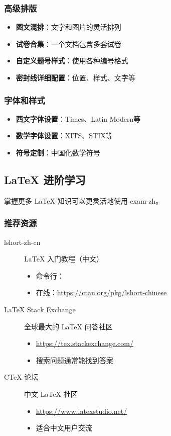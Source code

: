 \subsubsection{高级排版}

\begin{itemize}
  \item \textbf{图文混排}：文字和图片的灵活排列
  \item \textbf{试卷合集}：一个文档包含多套试卷
  \item \textbf{自定义题号样式}：使用各种编号格式
  \item \textbf{密封线详细配置}：位置、样式、文字等
\end{itemize}

\subsubsection{字体和样式}

\begin{itemize}
  \item \textbf{西文字体设置}：Times、Latin Modern等
  \item \textbf{数学字体设置}：XITS、STIX等
  \item \textbf{符号定制}：中国化数学符号
\end{itemize}


\subsection{LaTeX 进阶学习}

掌握更多 \LaTeX{} 知识可以更灵活地使用 exam-zh。

\subsubsection{推荐资源}

\begin{description}
  \item[lshort-zh-cn] \LaTeX{} 入门教程（中文）
    \begin{itemize}
      \item 命令行：
      \item 在线：\url{https://ctan.org/pkg/lshort-chinese}
    \end{itemize}

  \item[LaTeX Stack Exchange] 全球最大的 \LaTeX{} 问答社区
    \begin{itemize}
      \item \url{https://tex.stackexchange.com/}
      \item 搜索问题通常能找到答案
    \end{itemize}

  \item[CTeX 论坛] 中文 \LaTeX{} 社区
    \begin{itemize}
      \item \url{https://www.latexstudio.net/}
      \item 适合中文用户交流
    \end{itemize}
\end{description}

